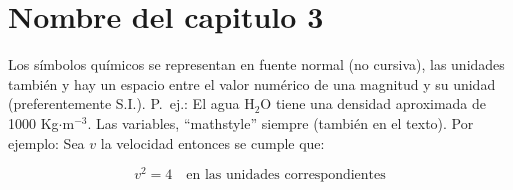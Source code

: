 \chapter{Nombre del capitulo 3}
\graphicspath{{figuras/cap3/}}

\label{cap:captres}

Los símbolos químicos se representan en fuente normal (no cursiva), las unidades también y hay un espacio entre el valor numérico de una magnitud y su unidad (preferentemente S.I.). P.\ ej.: El agua H$_{2}$O tiene una densidad aproximada de 1000 Kg$\cdot$m$^{-3}$. Las variables, ``mathstyle'' siempre (también en el texto). Por ejemplo: Sea $v$ la velocidad entonces se cumple que:

\[
 v^{2}=4 \quad \mbox{en las unidades correspondientes}
\]
